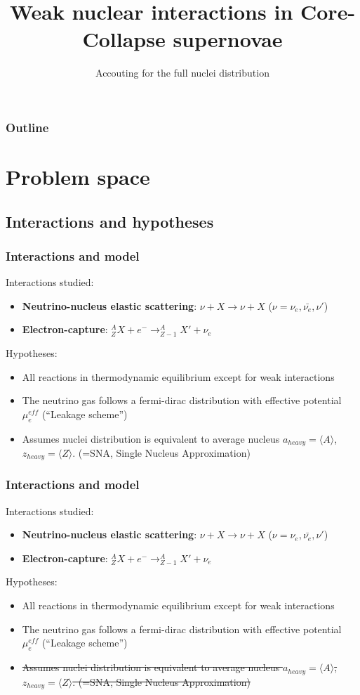 \documentclass{beamer}
\title{Weak nuclear interactions in Core-Collapse supernovae}
\subtitle{Accouting for the full nuclei distribution}
\date{}
\begin{document}
\begin{frame}
\titlepage
\end{frame}

\begin{frame}
\frametitle{Outline}
\tableofcontents
\end{frame}

\section{Problem space}
\subsection{Interactions and hypotheses}


\begin{frame}
\frametitle{Interactions and model}

Interactions studied:
\begin{itemize}
\item \textbf{Neutrino-nucleus elastic scattering}: $\nu + X \to \nu + X$ ($\nu = \nu_e, \bar{\nu_e}, \nu'$)
\item \textbf{Electron-capture}: $^{A}_{Z} X + e^{-} \to ^{A}_{Z-1} X' + \nu_e$
\end{itemize}

Hypotheses:
\begin{itemize}
\item All reactions in thermodynamic equilibrium except for weak interactions
\item The neutrino gas follows a fermi-dirac distribution with effective potential $\mu^{eff}_e$ (``Leakage scheme'')
\item Assumes nuclei distribution is equivalent to average nucleus $a_{heavy} = \langle A \rangle$, $z_{heavy} = \langle Z \rangle$. (=SNA, Single Nucleus Approximation)
\end{itemize}
\end{frame}

\begin{frame}
\frametitle{Interactions and model}

Interactions studied:
\begin{itemize}
\item \textbf{Neutrino-nucleus elastic scattering}: $\nu + X \to \nu + X$ ($\nu = \nu_e, \bar{\nu_e}, \nu'$)
\item \textbf{Electron-capture}: $^{A}_{Z} X + e^{-} \to ^{A}_{Z-1} X' + \nu_e$
\end{itemize}

Hypotheses:
\begin{itemize}
\item All reactions in thermodynamic equilibrium except for weak interactions
\item The neutrino gas follows a fermi-dirac distribution with effective potential $\mu^{eff}_e$ (``Leakage scheme'')
\item \sout{Assumes nuclei distribution is equivalent to average nucleus $a_{heavy} = \langle A \rangle$, $z_{heavy} = \langle Z \rangle$. (=SNA, Single Nucleus Approximation)}
\end{itemize}
\end{frame}
\end{document}
